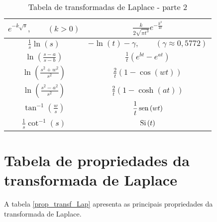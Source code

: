 \begin{table}
\begin{small}
\begin{center}
{\begin{tabular}{|c|c|}
\hline
 $\displaystyle e^{-k\sqrt{s}},\qquad (k>0) $&$\displaystyle  \frac{k}{2\sqrt{\pi t^3}}e^{-\frac{k^2}{4t}}$ \\[1ex] 
\hline
 $\displaystyle \frac{1}{s}\ln(s)$&$\displaystyle  -\ln(t)-\gamma,\qquad (\gamma\approx 0,5772) $  \\[1ex] 
\hline
 $\displaystyle \ln\left(\frac{s-a}{s-b}\right) $&$\displaystyle  \frac{1}{t}\left(e^{bt}-e^{at}\right)$ \\[1ex] 
\hline
 $\displaystyle \ln\left(\frac{s^2+w^2}{s^2}\right) $&$\displaystyle  \frac{2}{t}\left(1-\cos(wt)\right)$ \\[1ex] 
\hline
 $\displaystyle \ln\left(\frac{s^2-a^2}{s^2}\right)$&$\displaystyle  \frac{2}{t}\left(1-\cosh(at)\right)$ \\[1ex] 
\hline
 $\displaystyle \tan^{-1}\left(\frac{w}{s}\right)$&$\displaystyle  \frac{1}{t}\operatorname{sen}\,(wt)$ \\[1ex] 
\hline
 $\displaystyle \frac{1}{s}\cot^{-1}(s) $&$\displaystyle  \hbox{Si}\ \!(t)$ \\[1ex] 
\hline
\end{tabular}}
\caption{\label{tab_trans_Lap_2}Tabela de transformadas de Laplace - parte 2}
\end{center}
\end{small}
\end{table}

\newpage
\section{Tabela de propriedades da transformada de Laplace}{\label{ap_A2}}
A tabela \ref{prop_transf_Lap} apresenta as principais propriedades da transformada de Laplace.

